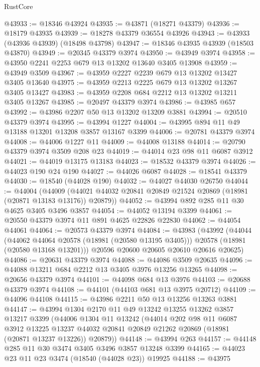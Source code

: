 \begin{lexlean}{RustCore}
\begin{coremodule}
@43933 := @18346 @43924
@43935 := @43871 (@18271 @43379)
@43936 := @18179 @43935
@43939 := @18278 @43379 @36554 @43926
@43943 := @43933 (@43936 @43939) (@18498 @43798)
@43947 := @18346 @43935 @43939 (@18503 @43870)
@43949 := @20345 @43379 @3974
@43950 := @43949 @3974
@43958 := @43950 @2241 @2253 @679 @13 @13202 @13640 @3405 @13908
@43959 := @43949 @3509
@43967 := @43959 @2227 @2239 @679 @13 @13202 @13427 @3405 @13640
@43975 := @43959 @2213 @2225 @679 @13 @13202 @13267 @3405 @13427
@43983 := @43959 @2208 @684 @2212 @13 @13202 @13211 @3405 @13267
@43985 := @20497 @43379 @3974
@43986 := @43985 @657
@43992 := @43986 @2207 @50 @13 @13202 @13209 @3881
@43994 := @20510 @43379 @3974
@43995 := @43994 @1227
@44004 := @43995 @894 @11 @49 @13188 @13201 @13208 @3857 @13167 @3399
@44006 := @20781 @43379 @3974
@44008 := @44006 @1227 @11
@44009 := @44008 @13188
@44014 := @20790 @43379 @3974 @3509 @208 @23
@44019 := @44014 @23 @98 @11 @6087 @3912
@44021 := @44019 @13175 @13183
@44023 := @18532 @43379 @3974
@44026 := @44023 @190 @24 @190
@44027 := @44026 @6087
@44028 := @18541 @43379
@44030 := @18540 (@44028 @190)
@44032 := @44027 @44030 @26750
@44044 := @44004
    (@44009 (@44021 @44032 @20841 @20849 @21524 @20869 (@18981 (@20871 @13183 @13176)) @20879))
@44052 := @43994 @892 @285 @11 @30 @4625 @3405 @3496 @3857
@44054 := @44052 @13194 @3399
@44061 := @20550 @43379 @3974 @11 @891 @4625 @22826 @22830
@44062 := @44054 @44061
@44064 := @20573 @43379 @3974
@44084 := @43983
    (@43992
      (@44044
        (@44062 @44064 @20578 (@18981 (@20580 @13195 @3405)))
        @20578
        (@18981 (@20580 @13168 @13201)))
      @20596
      @20600
      @20605
      @20610
      @20616
      @20625)
@44086 := @20631 @43379 @3974
@44088 := @44086 @3509 @20635
@44096 := @44088 @13211 @684 @2212 @13 @3405 @3976 @13256 @13265
@44098 := @20656 @43379 @3974
@44101 := @44098 @684 @13 @3976
@44103 := @20688 @43379 @3974
@44108 := @44101 (@44103 @681 @13 @3975 @20712)
@44109 := @44096 @44108
@44115 := @43986 @2211 @50 @13 @13256 @13263 @3881
@44147 := @43994
    @1304
    @2170
    @11
    @49
    @13242
    @13255
    @13262
    @3857
    @13217
    @3399
    (@44006
      @1304
      @11
      @13242
      (@44014
        @202
        @98
        @11
        @6087
        @3912
        @13225
        @13237
        @44032
        @20841
        @20849
        @21262
        @20869
        (@18981 (@20871 @13237 @13226))
        @20879))
@44148 := @43994 @263
@44157 := @44148 @285 @11 @30 @3474 @3405 @3496 @3857 @13248 @3399
@44165 := @44023 @23 @11 @23 @3474 (@18540 (@44028 @23)) @19925
@44188 := @43975

\end{coremodule}
\end{lexlean}
